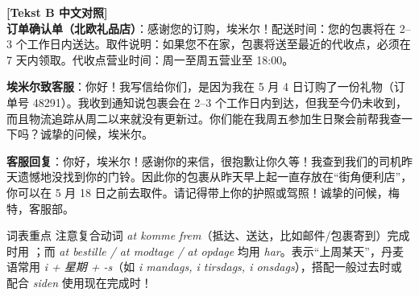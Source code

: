 \begin{transbox}
\small
\textbf{\color{NCDTeal}[Tekst B 中文对照]}\\
\textbf{订单确认单（北欧礼品店）}：感谢您的订购，埃米尔！配送时间：您的包裹将在 2--3 个工作日内送达。取件说明：如果您不在家，包裹将送至最近的代收点，必须在 7 天内领取。代收点营业时间：周一至周五营业至 18:00。

\textbf{埃米尔致客服}：你好！我写信给你们，是因为我在 5 月 4 日订购了一份礼物（订单号 48291）。我收到通知说包裹会在 2--3 个工作日内到达，但我至今仍未收到，而且物流追踪从周二以来就没有更新过。你们能在我周五参加生日聚会前帮我查一下吗？诚挚的问候，埃米尔。

\textbf{客服回复}：你好，埃米尔！感谢你的来信，很抱歉让你久等！我查到我们的司机昨天遗憾地没找到你的门铃。因此你的包裹从昨天早上起一直存放在“街角便利店”，你可以在 5 月 18 日之前去取件。请记得带上你的护照或驾照！诚挚的问候，梅特，客服部。
\end{transbox}


\begin{tipbox}{词表重点}
注意复合动词 \textit{at komme frem}（抵达、送达，比如邮件/包裹寄到）完成时用 \dabold{[er]}；而 \textit{at bestille / at modtage / at opdage} 均用 \textit{har}。表示“上周某天”，丹麦语常用 \textit{i + 星期 + -s}（如 \textit{i mandags, i tirsdags, i onsdags}），搭配一般过去时或配合 \textit{siden} 使用现在完成时！
\end{tipbox}

